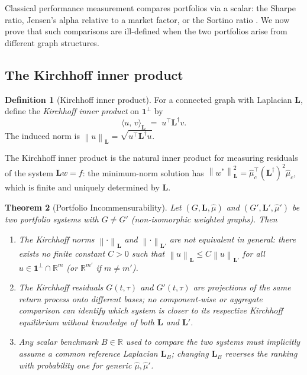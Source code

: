 \documentclass[twocolumn,11pt,a4paper]{article}
\theoremstyle{plain}
\newtheorem{theorem}{Theorem}[section]
\theoremstyle{definition}
\newtheorem{definition}[theorem]{Definition}
\theoremstyle{remark}
\newcommand{\R}{\mathbb{R}}
\newcommand{\Lop}{\mathbf{L}}        %
\newcommand{\Lpinv}{\mathbf{L}^{\dagger}} %
\newcommand{\wstar}{w^{*}}
\newcommand{\norm}[1]{\left\|#1\right\|}
\newcommand{\inner}[2]{\langle #1,\, #2\rangle}
\newcommand{\one}{\mathbf{1}}
\begin{document}
Classical performance measurement compares portfolios via a scalar:
the Sharpe ratio, Jensen's alpha relative to a market factor, or the
Sortino ratio \cite{Markowitz1952,Merton1969}.  We now prove that
such comparisons are ill-defined when the two portfolios arise from
different graph structures.

\subsection{The Kirchhoff inner product}
\label{sec:kirchhoff_inner}

\begin{definition}[Kirchhoff inner product]
  For a connected graph with Laplacian $\Lop$, define the
  \emph{Kirchhoff inner product} on $\one^{\perp}$ by
  \begin{equation}
    \inner{u}{v}_{\Lop} \;=\; u^{\top}\Lpinv v.
    \label{eq:kirchhoff_inner}
  \end{equation}
  The induced norm is $\norm{u}_{\Lop}=\sqrt{u^{\top}\Lpinv u}$.
\end{definition}

The Kirchhoff inner product is the natural inner product for measuring
residuals of the system $\Lop w=f$: the minimum-norm solution has
$\norm{\wstar}_{\Lop}^2=\hat\mu_c^{\top}(\Lpinv)^2\hat\mu_c$, which
is finite and uniquely determined by $\Lop$.

\begin{theorem}[Portfolio Incommensurability]
  \label{thm:incommensurability}
  Let $(G,\Lop,\hat\mu)$ and $(G',\Lop',\hat\mu')$ be two portfolio
  systems with $G\ne G'$ (non-isomorphic weighted graphs).  Then
  \begin{enumerate}[label=(\roman*)]
    \item\label{it:incomm_norms}
      The Kirchhoff norms $\norm{\cdot}_{\Lop}$ and
      $\norm{\cdot}_{\Lop'}$ are not equivalent in general: there
      exists no finite constant $C>0$ such that
      $\norm{u}_{\Lop}\le C\norm{u}_{\Lop'}$ for all
      $u\in\one^{\perp}\cap\R^m$ (or $\R^{m'}$ if $m\ne m'$).

    \item\label{it:incomm_residuals}
      The Kirchhoff residuals $G(t,\tau)$ and $G'(t,\tau)$ are
      projections of the same return process onto different bases;
      no component-wise or aggregate comparison can identify which
      system is closer to its respective Kirchhoff equilibrium
      without knowledge of both $\Lop$ and $\Lop'$.

    \item\label{it:incomm_benchmark}
      Any scalar benchmark $B\in\R$ used to compare the two
      systems must implicitly assume a common reference Laplacian
      $\Lop_B$; changing $\Lop_B$ reverses the ranking with
      probability one for generic $\hat\mu,\hat\mu'$.
  \end{enumerate}
\end{theorem}
\end{document}
